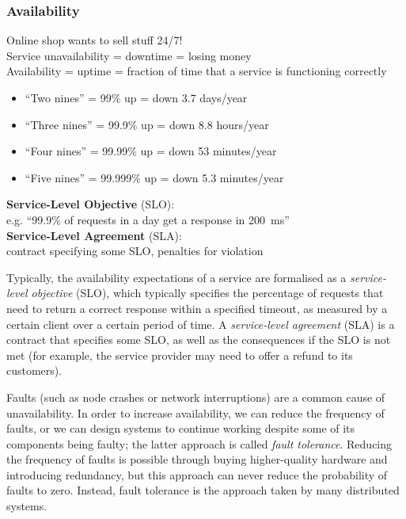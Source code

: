 \begin{frame}
    \label{s:availability}
    \frametitle{Availability}
    Online shop wants to sell stuff 24/7! \\
    Service unavailability = downtime = losing money \\[1em]
    Availability = uptime = fraction of time that a service is functioning correctly
    \begin{itemize}
        \item ``Two nines'' = 99\% up = down 3.7 days/year
        \item ``Three nines'' = 99.9\% up = down 8.8 hours/year
        \item ``Four nines'' = 99.99\% up = down 53 minutes/year
        \item ``Five nines'' = 99.999\% up = down 5.3 minutes/year\\[1.5em]
    \end{itemize}\pause
    \textbf{Service-Level Objective} (SLO):\\ e.g. ``99.9\% of requests in a day get a response in 200~ms''\\[1em]
    \textbf{Service-Level Agreement} (SLA):\\ contract specifying some SLO, penalties for violation
\end{frame}
\label{l:availability}

Typically, the availability expectations of a service are formalised as a \emph{service-level objective} (SLO), which typically specifies the percentage of requests that need to return a correct response within a specified timeout, as measured by a certain client over a certain period of time.
A \emph{service-level agreement} (SLA) is a contract that specifies some SLO, as well as the consequences if the SLO is not met (for example, the service provider may need to offer a refund to its customers).

Faults (such as node crashes or network interruptions) are a common cause of unavailability.
In order to increase availability, we can reduce the frequency of faults, or we can design systems to continue working despite some of its components being faulty; the latter approach is called \emph{fault tolerance}.
Reducing the frequency of faults is possible through buying higher-quality hardware and introducing redundancy, but this approach can never reduce the probability of faults to zero.
Instead, fault tolerance is the approach taken by many distributed systems.


